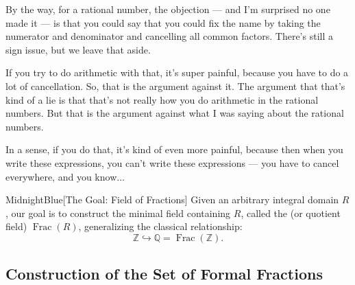 \begin{speech}[00:35:03 - 00:36:16]
By the way, for a rational number, the objection --- and I'm surprised no one made it --- is that you could say that you could fix the name by taking the numerator and denominator and cancelling all common factors. There's still a sign issue, but we leave that aside.

If you try to do arithmetic with that, it's super painful, because you have to do a lot of cancellation. So, that is the argument against it. The argument that that's kind of a lie is that that's not really how you do arithmetic in the rational numbers. But that is the argument against what I was saying about the rational numbers.

In a sense, if you do that, it's kind of even more painful, because then when you write these expressions, you can't write these expressions --- you have to cancel everywhere, and you know...
\end{speech}

\begin{content}

\begin{highlight}{MidnightBlue}[The Goal: Field of Fractions]
Given an arbitrary integral domain $R$, our goal is to construct the minimal field containing $R$, called the  (or quotient field) $\operatorname{Frac}(R)$, generalizing the classical relationship:
\[
\mathbb{Z} \hookrightarrow \mathbb{Q} = \operatorname{Frac}(\mathbb{Z}).
\]
\end{highlight}
\end{content}

\subsection{Construction of the Set of Formal Fractions}

